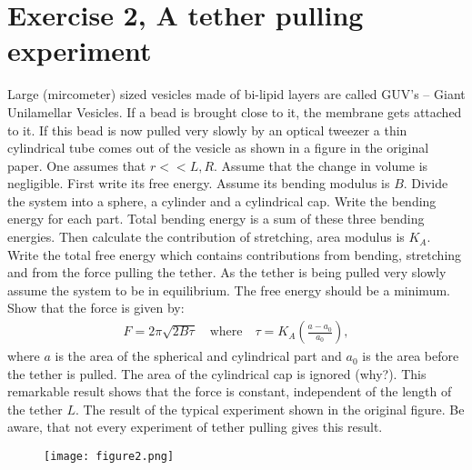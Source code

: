 \documentclass[a4paper]{article}
\begin{document}
\section*{Exercise 2, A tether pulling experiment}
Large (mircometer) sized vesicles made of bi-lipid layers are called GUV's -- Giant Unilamellar Vesicles. If a bead is brought close to it, the membrane gets attached to it.
If this bead is now pulled very slowly by an optical tweezer a thin cylindrical tube comes out of the vesicle as shown in a figure in the original paper. One assumes that $r<< L, R$.
Assume that the change in volume is negligible. First write its free energy. Assume its bending modulus is $B$. Divide the system into a sphere, a cylinder and a cylindrical cap. 
Write the bending energy for each part. Total bending energy is a sum of these three bending energies. Then calculate the contribution of stretching, area modulus is $K_A$.
Write the total free energy which contains contributions from bending, stretching and from the force pulling the tether.
As the tether is being pulled very slowly assume the system to be in equilibrium. The free energy should be a minimum. Show that the force is given by:
\begin{align*}
    F = 2\pi\sqrt{2B \tau}\quad \text{where} \quad \tau = K_A \left(\frac{a - a_0}{a_0}\right),
\end{align*}where $a$ is the area of the spherical and cylindrical part and $a_0$ is the area before the tether is pulled. The area of the cylindrical cap is ignored (why?). 
This remarkable result shows that the force is constant, independent of the length of the tether $L$. The result of the typical experiment shown in the original figure.
Be aware, that not every experiment of tether pulling gives this result.
\begin{figure}[H]
    \centering
    \texttt{[image: figure2.png]}
\end{figure}
\end{document}

